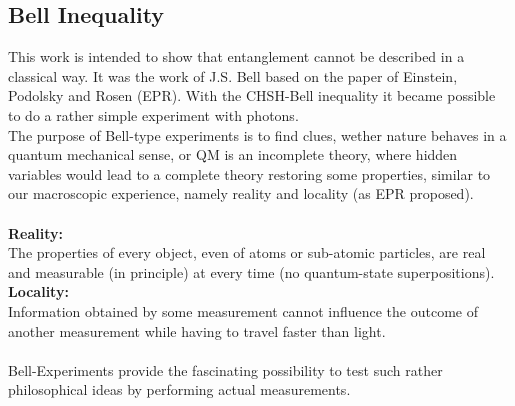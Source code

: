 \documentclass[12pt,a4paper]{article}
\begin{document}
\begin{multicols}{2}

%

\section{Bell Inequality}
This work is intended to show that entanglement cannot be described in a classical way. It was the work of J.S. Bell based on the paper of Einstein, Podolsky and Rosen (EPR). With the CHSH-Bell inequality it became possible to do a rather simple experiment with photons.\\
The purpose of Bell-type experiments is to find clues, wether nature behaves in a quantum mechanical sense, or QM is an incomplete theory, where hidden variables would lead to a complete theory restoring some properties, similar to our macroscopic experience, namely  reality and locality (as EPR proposed).\\
\\
\textbf{Reality:}\\ The properties of every object, even of atoms or sub-atomic particles, are real and measurable (in principle) at every time (no quantum-state superpositions).\\
\textbf{Locality:}\\
Information obtained by some measurement cannot influence the outcome of another measurement while having to travel faster than light.\\
\\
Bell-Experiments provide the fascinating possibility to test such rather philosophical ideas by performing actual measurements.


\end{multicols}
\end{document}
